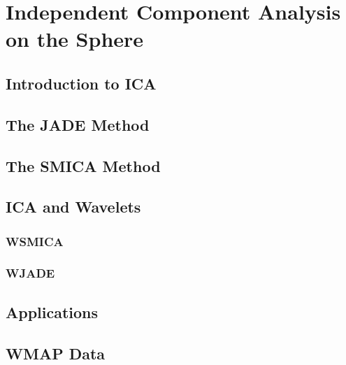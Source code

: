 

\chapter{Independent Component Analysis on the Sphere}
\label{ch_mms}

\section{Introduction to ICA}

\section{The JADE Method}
\section{The SMICA Method}

\section{ICA and Wavelets}
\subsection{WSMICA}
\subsection{WJADE}

\section{Applications}

\section{WMAP Data}
